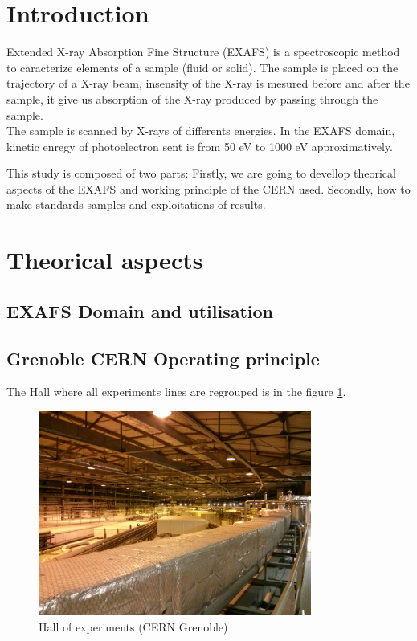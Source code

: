 \documentclass[11pt,a4paper,oneside]{article}
\begin{document}


\section*{Introduction}
	
		
Extended X-ray Absorption Fine Structure (EXAFS) is a spectroscopic method to caracterize elements of a sample (fluid or solid). The sample is placed on the trajectory of a X-ray beam, insensity of the X-ray is mesured before and after the sample, it give us absorption of the X-ray produced by passing through the sample.\\
 The sample is scanned by X-rays of differents energies. In the EXAFS domain, kinetic enregy of photoelectron sent is from 50 eV to 1000 eV approximatively.\medskip
	 
 This study is composed of two parts: Firstly, we are going to devellop theorical aspects of the EXAFS and working principle of the CERN used. Secondly, how to make standards samples and exploitations of results.
	



\newpage
	

\section{Theorical aspects}
\subsection{EXAFS Domain and utilisation}


\subsection{Grenoble CERN Operating principle}

The Hall where all experiments lines are regrouped is in the figure \ref{Hall}.\medskip

\begin{figure}[H]
    \begin{center}
        \includegraphics[width=0.8\textwidth]{Images/IMG_20151210_213319.jpg}
        \caption{Hall of experiments (CERN Grenoble)}
        \label{Hall}
    \end{center}
\end{figure}
\medskip
\end{document}
